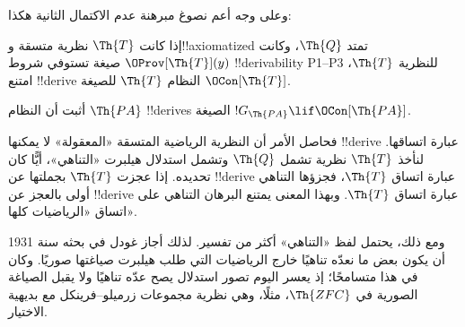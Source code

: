 \documentclass[../../../include/open-logic-section]{subfiles}
\begin{document}
وعلى وجه أعم نصوغ مبرهنة عدم الاكتمال الثانية هكذا:

\begin{thm}
 إذا كانت $\Th{T}$
نظرية متسقة و!!{axiomatized} تمتد $\Th{Q}$، وكانت
$\OProv[\Th{T}](y)$ صيغة تستوفي شروط !!{derivability}
P1--P3 للنظرية $\Th{T}$، امتنع !!{derive} النظام
$\Th{T}$ للصيغة $\OCon[\Th{T}]$.
\end{thm}

\begin{prob}
أثبت أن النظام $\Th{PA}$ !!{derive}s الصيغة
$!G_{\Th{PA}} \lif \OCon[\Th{PA}]$.
\end{prob}

\begin{digress}
فحاصل الأمر أن النظرية الرياضية المتسقة «المعقولة» لا يمكنها
!!{derive} عبارة اتساقها. لنأخذ $\Th{T}$ نظرية تشمل
$\Th{Q}$ وتشمل استدلال هيلبرت «التناهي»، أيًّا كان تحديده.
إذا عجزت $\Th{T}$ بجملتها عن !!{derive} عبارة اتساق $\Th{T}$،
فجزؤها التناهي أولى بالعجز عن !!{derive} عبارة اتساق $\Th{T}$.
وبهذا المعنى يمتنع البرهان التناهي على اتساق «الرياضيات كلها».

ومع ذلك، يحتمل لفظ «التناهي» أكثر من تفسير. لذلك أجاز غودل
في بحثه سنة 1931 أن يكون بعض ما نعدّه تناهيًا خارج الرياضيات التي
طلب هيلبرت صياغتها صوريًا. وكان في هذا متسامحًا؛ إذ يعسر اليوم
تصور استدلال يصح عدّه تناهيًا ولا يقبل الصياغة الصورية في
$\Th{ZFC}$، مثلًا، وهي نظرية مجموعات زرميلو--فرينكل مع بديهية
الاختيار.
\end{digress}
\end{document}
